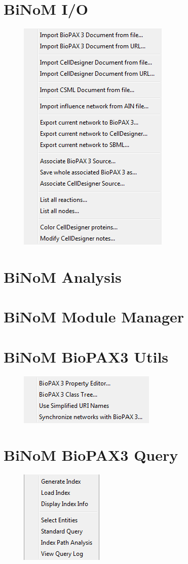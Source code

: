 \documentclass[11pt]{article}
\begin{document}
\section{BiNoM I/O}
\begin{figure}[h]
\includegraphics{graphics/BiNoM_I_O}
\end{figure}
\newpage
\section{BiNoM Analysis}

\newpage
\section{BiNoM Module Manager}

\newpage
\section{BiNoM BioPAX3 Utils}
\begin{figure}[h]
\includegraphics{graphics/BiNoM_BioPAX3_Utils}
\end{figure}
\newpage
\section{BiNoM BioPAX3 Query}
\begin{figure}[h]
\includegraphics{graphics/BiNoM_BioPAX3_Query}
\end{figure}
\newpage
\end{document}
